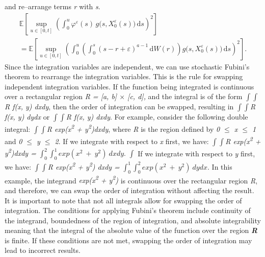 \documentclass[12pt,a4paper]{report}
\numberwithin{equation}{section}
\begin{document}
and re--arrange terms \emph{r} with \emph{s}.
\[
\begin{aligned}
\mathbb{E}\!\left[\sup_{u\in[0,t]}
\left(\int_{0}^{u}\varphi^{\varepsilon}(s)\,g\bigl(s,X_{0}^{\varepsilon}(s)\bigr)\,\mathrm{d}s\right)^{2}\right]
\\
= \mathbb{E}\!\left[\sup_{u\in[0,t]}
\left(\int_{0}^{u}\left(\int_{0}^{s}(s-r+\varepsilon)^{a-1}\,\mathrm{d}W(r)\right)
g\bigl(s,X_{0}^{\varepsilon}(s)\bigr)\,\mathrm{d}s\right)^{2}\right].
\end{aligned}
\]
Since the integration variables are independent, we can use stochastic
Fubini's theorem \cite{llendeto2007modeling_82} to rearrange the integration variables. This
is the rule for swapping independent integration variables. If the
function being integrated is continuous over a rectangular region
\emph{R = {[}a, b{]} $\times$ {[}c, d{]},} and the integral is of the form
\emph{$\int$$\int$R f(x, y) dxdy}, then the order of integration can be swapped,
resulting in \emph{$\int$$\int$R f(x, y) dydx} or \emph{$\int$$\int$R f(x, y) dxdy}. For
example, consider the following double integral: \emph{$\int$$\int$R
exp(x\textsuperscript{2} + y\textsuperscript{2})dxdy}, where \emph{R} is
the region defined by \emph{0 $\leq$ x $\leq$ 1} and \emph{0 $\leq$ y $\leq$ 2}. If we
integrate with respect to \emph{x} first, we have: \emph{$\int$$\int$R
exp(x\textsuperscript{2} + y\textsuperscript{2})dxdy =}
\(\int_{0}^{2}{\int_{0}^{1}{exp(x^{2}\  + \ y^{2})\ dxdy.}}\) \emph{$\int$}
If we integrate with respect to \emph{y} first, we have: \emph{$\int$$\int$R
exp(x\textsuperscript{2} + y\textsuperscript{2}) dxdy =}
\(\int_{0}^{1}{\int_{0}^{2}{exp(x^{2}\  + \ y^{2})\ dydx.}}\) In this
example, the integrand \emph{exp(x\textsuperscript{2} +
y\textsuperscript{2})} is continuous over the rectangular region
\emph{R}, and therefore, we can swap the order of integration without
affecting the result. It is important to note that not all integrals
allow for swapping the order of integration. The conditions for applying
Fubini's theorem include continuity of the integrand, boundedness of the
region of integration, and absolute integrability meaning that the
integral of the absolute value of the function over the region
\emph{\textbf{R}} is finite. If these conditions are not met, swapping
the order of integration may lead to incorrect results.
\end{document}
